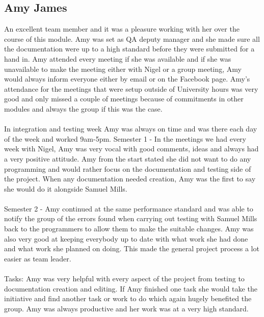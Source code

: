 \documentclass[titlepage]{article}
\begin{document}
{\subsection {Amy James}
An excellent team member and it was a pleasure working with her over the course of this module. Amy was set as QA deputy manager and she made sure all the documentation were up to a high standard before they were submitted for a hand in.
Amy attended every meeting if she was available and if she was unavailable to make the meeting either with Nigel or a group meeting, Amy would always inform 
everyone either by email or on the Facebook page. Amy's attendance for the meetings that were setup outside of University hours was very good and only missed a couple of meetings because of commitments in other modules and always the group if this was the case.
\\
\\
In integration and testing week Amy was always on time and was there each day of the week and worked 9am-5pm. 
Semester 1 - In the meetings we had every week with Nigel, Amy was very 
vocal with good comments, ideas and always had a very positive attitude. Amy from the start stated she did not want to do any programming and would rather focus on the documentation and testing side of the project. When any documentation needed creation, Amy was the first to say she would do it alongside Samuel Mills. 
\\
\\
Semester 2 - Amy continued at the same performance standard and was able to notify the group of the errors found when carrying out testing with Samuel Mills back to the programmers to allow them to make the suitable changes. Amy was also very good at keeping everybody up to date with what work 
she had done and what work she planned on doing. This made the general project process a lot easier as team leader.
\\
\\
Tasks: Amy was very helpful with every aspect of the project from testing to documentation creation and editing. If Amy finished one task she would take the initiative and find another task or work to do which again hugely benefited the group. Amy was always productive and her work was at a very high standard.
}
\end{document}
